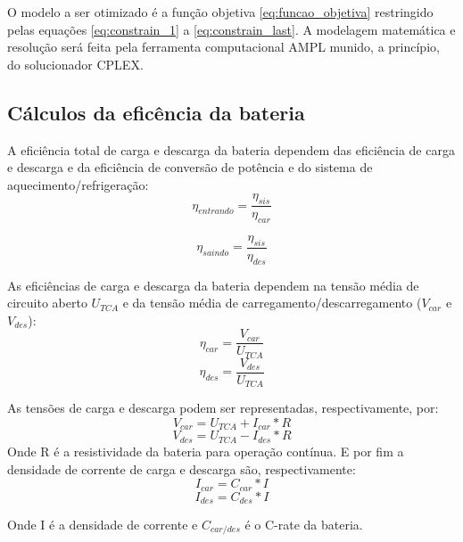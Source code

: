O modelo a ser otimizado é a função objetiva \ref{eq:funcao_objetiva} restringido pelas equações \ref{eq:constrain_1} a \ref{eq:constrain_last}. A modelagem matemática e resolução será feita pela ferramenta computacional AMPL munido, a princípio, do solucionador CPLEX.

\subsection{Cálculos da eficência da bateria}

A eficiência total de carga e descarga da bateria dependem das eficiência de carga e descarga e da eficiência de conversão de potência e do sistema de aquecimento/refrigeração:
\begin{equation}
    \eta_{entrando} = \frac{\eta_{sis} }{\eta_{car} }
\end{equation}

\begin{equation}
    \eta_{saindo} = \frac{\eta_{sis} }{\eta_{des} }
\end{equation}

As eficiências de carga e descarga da bateria dependem na tensão média de circuito aberto $U_{TCA}$ e da tensão média de carregamento/descarregamento ($V_{car}$ e $V_{des}$):
\begin{equation}
    \eta_{car} = \frac{V_{car} }{U_{TCA}}
\end{equation}
\begin{equation}
    \eta_{des} = \frac{V_{des} }{U_{TCA} }
\end{equation}

As tensões de carga e descarga podem ser representadas, respectivamente, por:
\begin{equation}
    V_{car} = U_{TCA} + I_{car}*R
\end{equation}
\begin{equation}
    V_{des} = U_{TCA} - I_{des}*R
\end{equation}
Onde R é a resistividade da bateria para operação contínua. E por fim a densidade de corrente de carga e descarga são, respectivamente:
\begin{equation}
    I_{car} = C_{car}*I
\end{equation}
\begin{equation}
    I_{des} = C_{des}*I
\end{equation}

Onde I é a densidade de corrente e $C_{car/des}$ é o C-rate da bateria.

